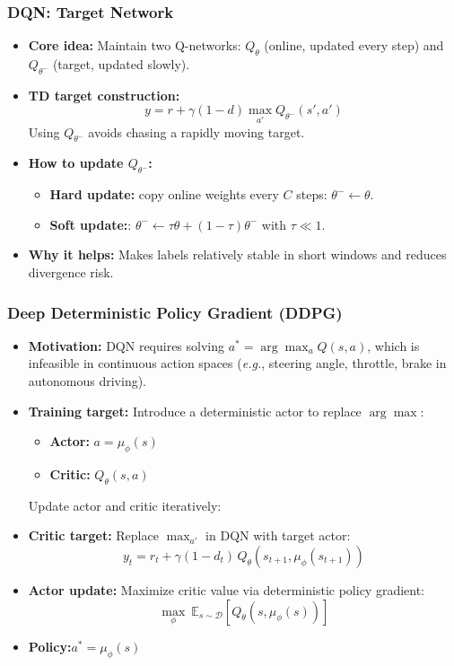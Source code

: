 \documentclass[11pt,aspectratio=169,xcolor={dvipsnames},usepdftitle=false]{beamer}
\newcommand{\eg}{\emph{e.g.},\xspace}
\begin{document}
\begin{frame}
\frametitle{DQN: Target Network}
\begin{itemize}
	\item \textbf{Core idea:}
	Maintain two Q-networks:
	$Q_\theta$ (online, updated every step) and
	$Q_{\theta^-}$ (target, updated slowly).

	\item \textbf{TD target construction:}
	\vspace{-1.0em}
    $$y = r + \gamma (1-d)\max_{a'}Q_{\theta^-}(s',a')$$
	Using $Q_{\theta^-}$ avoids chasing a rapidly moving target.

	\item \textbf{How to update $Q_{\theta^-}$:}
	\begin{itemize}
        \item \textbf{Hard update:} copy online weights every $C$ steps: $\theta^- \leftarrow \theta$.
        \item \textbf{Soft update:}: $\theta^- \leftarrow \tau\theta + (1-\tau)\theta^-$ with $\tau \ll 1$.
    \end{itemize}

	\item \textbf{Why it helps:}
	Makes labels relatively stable in short windows and reduces divergence risk.
\end{itemize}
\end{frame}


\begin{frame}
\frametitle{Deep Deterministic Policy Gradient (DDPG)}
\begin{itemize}
	\item \textbf{Motivation:}
	DQN requires solving $a^*=\arg\max_a Q(s,a)$,
	which is infeasible in continuous action spaces (\eg steering angle, throttle, brake in autonomous driving).

	\item \textbf{Training target:}
	Introduce a deterministic actor to replace $\arg\max$:
	\begin{itemize}
		\item \textbf{Actor:} $a = \mu_\phi(s)$
		\item \textbf{Critic:} $Q_\theta(s,a)$
	\end{itemize}
    Update actor and critic iteratively:

	\item \textbf{Critic target:}
	Replace $\max_{a'}$ in DQN with target actor:
	\vspace{-1.5em}
	$$
	y_t = r_t + \gamma (1-d_t)\, Q_{\theta}\!\left(s_{t+1}, \mu_{\phi}(s_{t+1})\right)
	$$

	\item \textbf{Actor update:}
	Maximize critic value via deterministic policy gradient:
	\vspace{-1.5em}
	$$
	\max_\phi \ \mathbb{E}_{s\sim\mathcal{D}} \left[ Q_\theta(s,\mu_\phi(s)) \right]
	$$

    \vspace{-1.0em}
	\item \textbf{Policy:}\hfill$a^*=\mu_\phi(s)$\hfill\null

\end{itemize}
\end{frame}
\end{document}
